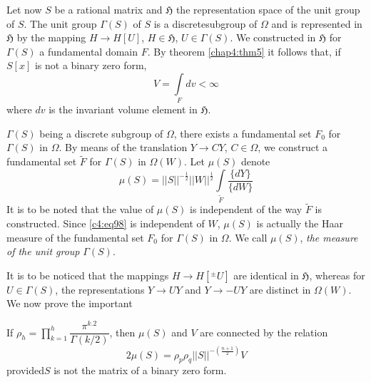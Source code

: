 Let now $S$ be a rational matrix and $\mathfrak{H}$ the representation
space of the unit group of $S$. The unit group $\Gamma(S)$ of $S$ is a
discrete\pageoriginale subgroup of $\Omega$ and is represented in
$\mathfrak{H}$ by the mapping $H\to H[U]$, $H\in\mathfrak{H}$,
$U\in\Gamma(S)$. We constructed in $\mathfrak{H}$ for $\Gamma(S)$ a
fundamental domain $F$. By theorem \ref{chap4:thm5} it follows that, if
$S[x]$ is not a binary zero form,
\begin{equation*}
V=\int\limits_{F}dv<\infty\tag{100}\label{c4:eq100}
\end{equation*}
where $dv$ is the invariant volume element in $\mathfrak{H}$.

$\Gamma(S)$ being a discrete subgroup of $\Omega$, there exists a
fundamental set $F_{0}$ for $\Gamma(S)$ in $\Omega$. By means of the
translation $Y\to CY$, $C\in\Omega$, we construct a fundamental set
$\widetilde{F}$ for $\Gamma(S)$ in $\Omega(W)$. Let $\mu(S)$ denote
\begin{equation*}
\mu(S)=||S||^{-\frac{1}{2}}||W||^{\frac{1}{2}}\int\limits_{\widetilde{F}}\frac{\{dY\}}{\{dW\}}\tag{101}\label{c4:eq101} 
\end{equation*}
It is to be noted that the value of $\mu(S)$ is independent of the way
$\widetilde{F}$ is constructed. Since \eqref{c4:eq98} is independent of
$W$, $\mu(S)$ is actually the Haar measure of the fundamental set
$F_{0}$ for $\Gamma(S)$ in $\Omega$. We call $\mu(S)$, {\em the
  measure of the unit group} $\Gamma(S)$.

It is to be noticed that the mappings $H\to H[{}^{\pm}U]$ are
identical in $\mathfrak{H}$, whereas for $U\in\Gamma(S)$, the
representations $Y\to UY$ and $Y\to -UY$ are distinct in
$\Omega(W)$. We now prove the important 

\begin{thm}\label{chap4:thm7}
If $\rho_{h}=\prod\limits^{h}_{k=1}\dfrac{\pi^{k.2}}{\Gamma(k/2)}$,
then $\mu(S)$ and $V$ are connected by the relation
$$
\boxed{2\mu(S)=\rho_{p}\rho_{q}||S||^{-(\frac{n+1}{2})} V} 
$$
provided\pageoriginale $S$ is not the matrix of a binary zero form.
\end{thm}

